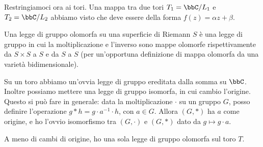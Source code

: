 	Restringiamoci ora ai tori. Una mappa tra due tori $T_1 = \bbC/L_1$ e $T_2 = \bbC/L_2$ abbiamo visto che deve essere della forma $f(z)=\alpha z + \beta$.
	
	\begin{definizione}
		Una legge di gruppo olomorfa su una superficie di Riemann $S$ è una legge di gruppo in cui la moltiplicazione e l'inverso sono mappe olomorfe rispettivamente da $S \times S$ a $S$ e da $S$ a $S$ (per un'opportuna definizione di mappa olomorfa da una varietà bidimensionale).
	\end{definizione}
	
	Su un toro abbiamo un'ovvia legge di gruppo ereditata dalla somma su $\bbC$. Inoltre possiamo mettere una legge di gruppo isomorfa, in cui cambio l'origine. Questo si può fare in generale: data la moltiplicazione $\cdot$ su un gruppo $G$, posso definire l'operazione $g * h = g\cdot a^{-1}\cdot h$, con $a\in G$. Allora $(G,*)$ ha $a$ come origine, e ho l'ovvio isomorfismo tra $(G,\cdot)$ e $(G,*)$ dato da $g\mapsto g\cdot a$.
	
	\begin{proposizione}
		A meno di cambi di origine, ho una sola legge di gruppo olomorfa sul toro $T$.
	\end{proposizione}
	
